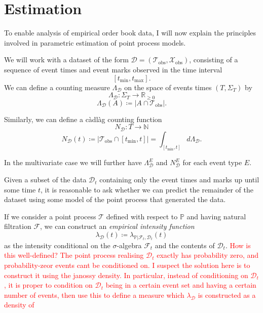 \documentclass[honours,12pt]{unswthesis}
\numberwithin{equation}{section}
\begin{document}
\chapter{Estimation}%

To enable analysis of empirical order book data, I will now explain the principles involved in parametric estimation of point process models.

We will work with a dataset of the form $\mathcal{D} = \left(\mathcal{T}_\mathrm{obs},\mathcal{X}_\mathrm{obs}\right)$, consisting of a sequence of event times and event marks observed in the time interval $$[t_\mathrm{min},t_\mathrm{max}].$$
We can define a counting measure $\Lambda_\mathcal{D}$ on the space of events times $(T,\Sigma_T)$ by
$$\Lambda_{\mathcal{D}} : \Sigma_T \to \mathbb{R}_{\geq 0}$$
$$\Lambda_{\mathcal{D}}(A) \coloneq \left\vert A\cap\mathcal{T}_\mathrm{obs}\right\vert.$$

Similarly, we can define a càdlàg counting function
$$N_\mathcal{D} : T \to \mathbb{N}$$
$$N_\mathcal{D}(t) \coloneq \left\vert \mathcal{T}_\mathrm{obs}\cap [t_\mathrm{min},t]\right\vert = \int_{[t_\mathrm{min},t]} d\Lambda_\mathcal{D}.$$

In the multivariate case we will further have $\Lambda_\mathcal{D}^E$ and $N_\mathcal{D}^E$ for each event type $E$.

Given a subset of the data $\mathcal{D}_t$ containing only the event times and marks up until some time $t$, it is reasonable to ask whether we can predict the remainder of the dataset using some model of the point process that generated the data.

If we consider a point process $\mathcal{T}$ defined with respect to $\mathbb{P}$ and having natural filtration $\mathcal{F}$, we can construct an \textit{empirical intensity function}
$$\lambda_\mathcal{D}(t) \coloneq \lambda_{\mathbb{P}\vert\mathcal{F}_t,\mathcal{D}_t}(t)$$
as the intensity conditional on the $\sigma$-algebra $\mathcal{F}_t$ and the contents of $\mathcal{D}_t$. \textcolor{red}{How is this well-defined? The point process realising $\mathcal{D}_t$ exactly has probability zero, and probability-zeor events cant be conditioned on. I suspect the solution here is to construct it using the janossy density. In particular, instead of conditioning on $\mathcal{D}_t$, it is proper to condition on $\mathcal{D}_t$ being in a certain event set and having a certain number of events, then use this to define a measure which $\lambda_\mathcal{D}$ is constructed as a density of}
\end{document}
